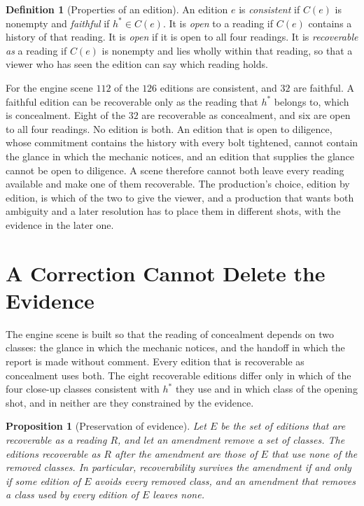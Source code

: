 \documentclass[11pt,twoside,openright]{book}
\theoremstyle{plain}
\newtheorem{proposition}[theorem]{Proposition}
\theoremstyle{definition}
\newtheorem{definition}[theorem]{Definition}
\theoremstyle{remark}
\begin{document}
\begin{definition}[Properties of an edition]\label{def:props}
An edition $e$ is \emph{consistent} if $C(e)$ is nonempty and \emph{faithful} if $h^\ast\in C(e)$. It is \emph{open} to a reading if $C(e)$ contains a history of that reading. It is \emph{open} if it is open to all four readings. It is \emph{recoverable as} a reading if $C(e)$ is nonempty and lies wholly within that reading, so that a viewer who has seen the edition can say which reading holds.
\end{definition}

For the engine scene $112$ of the $126$ editions are consistent, and $32$ are faithful. A faithful edition can be recoverable only as the reading that $h^\ast$ belongs to, which is concealment. Eight of the $32$ are recoverable as concealment, and six are open to all four readings. No edition is both. An edition that is open to diligence, whose commitment contains the history with every bolt tightened, cannot contain the glance in which the mechanic notices, and an edition that supplies the glance cannot be open to diligence. A scene therefore cannot both leave every reading available and make one of them recoverable. The production's choice, edition by edition, is which of the two to give the viewer, and a production that wants both ambiguity and a later resolution has to place them in different shots, with the evidence in the later one.

\section{A Correction Cannot Delete the Evidence}\label{sec:guarantee}

The engine scene is built so that the reading of concealment depends on two classes: the glance in which the mechanic notices, and the handoff in which the report is made without comment. Every edition that is recoverable as concealment uses both. The eight recoverable editions differ only in which of the four close-up classes consistent with $h^\ast$ they use and in which class of the opening shot, and in neither are they constrained by the evidence.

\begin{proposition}[Preservation of evidence]\label{prop:evidence}
Let $E$ be the set of editions that are recoverable as a reading $R$, and let an amendment remove a set of classes. The editions recoverable as $R$ after the amendment are those of $E$ that use none of the removed classes. In particular, recoverability survives the amendment if and only if some edition of $E$ avoids every removed class, and an amendment that removes a class used by every edition of $E$ leaves none.
\end{proposition}
\end{document}

